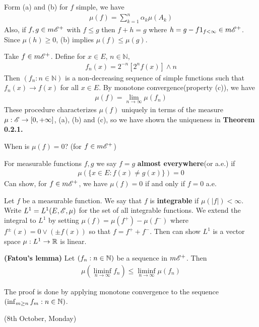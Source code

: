 \documentclass[12pt,a4paper]{report}
\begin{document}
Form (a) and (b) for $f$ simple, we have
\begin{align*}
\mu(f) = \sum_{k=1}^n \alpha_k \mu(A_k)
\end{align*}
Also, if $f,g \in m\mathscr{E}^+$ with $f\leq g$ then $f+h = g$ where $h = g- f1_{f<\infty} \in m\mathscr{E}^+$.  Since $\mu(h) \geq 0$, (b) implies $\mu(f) \leq \mu(g)$.
\s

Take $f\in m\mathscr{E}^+$. Define for $x\in E$, $n \in \mathbb{N}$,
\begin{align*}
f_n(x) = 2^{-n}[2^n f(x)] \wedge n 
\end{align*}
Then $(f_n:n\in \mathbb{N})$ is a non-decreasing sequence of simple functions such that $f_n(x) \rightarrow f(x)$ for all $x\in E$. By monotone convergence(property (c)), we have
\begin{align*}
\mu(f) = \lim_{n\rightarrow \infty} \mu(f_n)
\end{align*}
These procedure characterizes $\mu(f)$ uniquely in terms of the measure $\mu : \mathscr{E} \rightarrow [0,+\infty]$, (a), (b) and (c), so we have shown the uniqueness in \textbf{Theorem 0.2.1.}
\s

When is $\mu(f)=0$? (for $f\in m\mathscr{E}^+$)
\s

For measurable functions $f,g$ we say $f=g$ \textbf{almost everywhere}(or a.e.) if
\begin{align*}
\mu(\{x\in E : f(x) \neq g(x) \}) =0
\end{align*}
Can show, for $f\in m\mathscr{E}^+$, we have $\mu(f) =0$ if and only if $f=0$ a.e.
\s

Let $f$ be a measurable function. We say that $f$ is \textbf{integrable} if $\mu(|f|) <\infty$. Write $L^1 = L^1(E,\mathscr{E},\mu)$ for the set of all integrable functions. We extend the integral to $L^1$ by setting $\mu(f)= \mu(f^+) - \mu(f^-)$ where $f^{\pm}(x) = 0 \vee (\pm f(x))$ so that $f = f^+ + f^-$. Then can show $L^1$ is a vector space $\mu: L^1 \rightarrow \mathbb{R}$ is linear. 
\s

 \textbf{(Fatou's lemma)} Let $(f_n:n\in \mathbb{N})$ be a sequence in $m\mathscr{E}^+$. Then
\begin{align*}
\mu(\liminf_{n\rightarrow \infty} f_n) \leq \liminf_{n\rightarrow \infty} \mu(f_n)
\end{align*}
\eos

The proof is done by applying monotone convergence to the sequence $(\inf_{m\geq n} f_m : n \in \mathbb{N})$.
\s

\newday

(8th October, Monday)
\s
\end{document}
